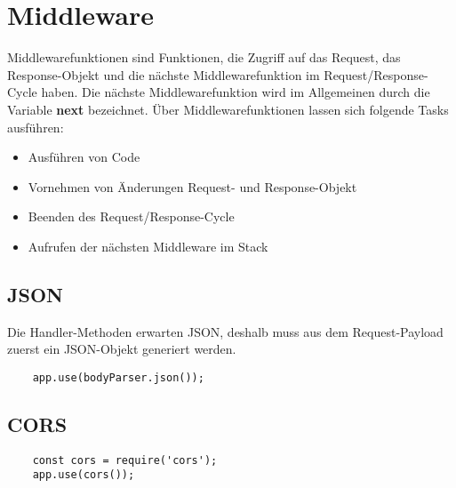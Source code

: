 \section{Middleware}

Middlewarefunktionen sind Funktionen, die Zugriff auf das Request, das Response-Objekt und die nächste Middlewarefunktion im Request/Response-Cycle haben. Die nächste Middlewarefunktion wird im Allgemeinen durch die Variable \textbf{next} bezeichnet.
Über Middlewarefunktionen lassen sich folgende Tasks ausführen:
\begin{itemize}
	\item Ausführen von Code
	\item Vornehmen von Änderungen Request- und Response-Objekt
	\item Beenden des Request/Response-Cycle
	\item Aufrufen der nächsten Middleware im Stack
\end{itemize}

\subsection{JSON}
Die Handler-Methoden erwarten JSON, deshalb muss aus dem Request-Payload zuerst ein JSON-Objekt generiert werden.

\begin{verbatim}
	app.use(bodyParser.json());
\end{verbatim}

\subsection{CORS}

\begin{verbatim}
	const cors = require('cors');
	app.use(cors());
\end{verbatim}

	